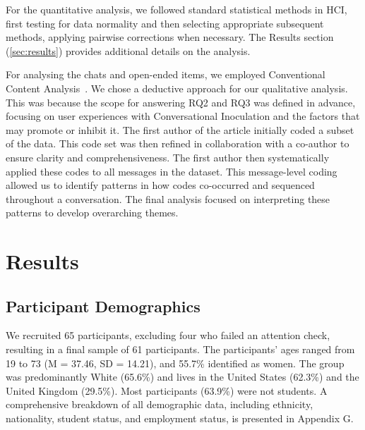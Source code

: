 \documentclass[sigconf]{acmart}
\begin{document}

For the quantitative analysis, we followed standard statistical methods in HCI, first testing for data normality and then selecting appropriate subsequent methods, applying pairwise corrections when necessary.
The Results section (\autoref{sec:results}) provides additional details on the analysis.

For analysing the chats and open-ended items, we employed Conventional Content Analysis~\cite{hsieh_three_2005}.
We chose a deductive approach for our qualitative analysis. This was because the scope for answering RQ2 and RQ3 was defined in advance, focusing on user experiences with Conversational Inoculation and the factors that may promote or inhibit it.
The first author of the article initially coded a subset of the data.
This code set was then refined in collaboration with a co-author to ensure clarity and comprehensiveness.
The first author then systematically applied these codes to all messages in the dataset.
This message-level coding allowed us to identify patterns in how codes co-occurred and sequenced throughout a conversation.
The final analysis focused on interpreting these patterns to develop overarching themes.

\section{Results}
\label{sec:results}
\subsection{Participant Demographics}

We recruited 65 participants, excluding four who failed an attention check, resulting in a final sample of 61 participants. The participants' ages ranged from 19 to 73 (M = 37.46, SD = 14.21), and 55.7\% identified as women. The group was predominantly White (65.6\%) and lives in the United States (62.3\%) and the United Kingdom (29.5\%). Most participants (63.9\%) were not students. A comprehensive breakdown of all demographic data, including ethnicity, nationality, student status, and employment status, is presented in Appendix G.
\end{document}
